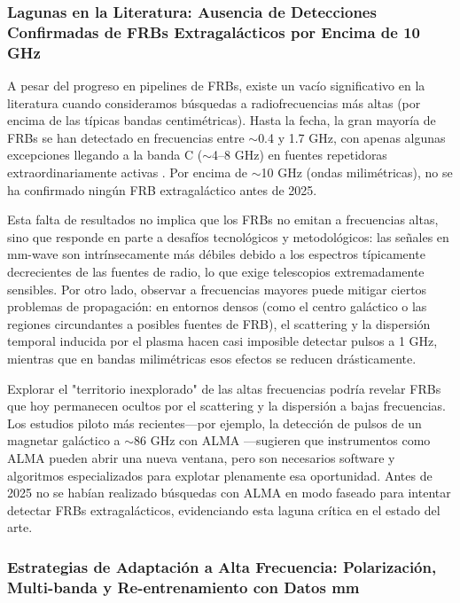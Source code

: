 \subsubsection{Lagunas en la Literatura: Ausencia de Detecciones Confirmadas de FRBs Extragalácticos por Encima de 10 GHz}

A pesar del progreso en pipelines de FRBs, existe un vacío significativo en la literatura cuando consideramos búsquedas a radiofrecuencias más altas (por encima de las típicas bandas centimétricas). Hasta la fecha, la gran mayoría de FRBs se han detectado en frecuencias entre $\sim$0.4 y 1.7 GHz, con apenas algunas excepciones llegando a la banda C ($\sim$4--8 GHz) en fuentes repetidoras extraordinariamente activas \citep{Gajjar2018,Bethapudi2023}. Por encima de $\sim$10 GHz (ondas milimétricas), no se ha confirmado ningún FRB extragaláctico antes de 2025.

Esta falta de resultados no implica que los FRBs no emitan a frecuencias altas, sino que responde en parte a desafíos tecnológicos y metodológicos: las señales en mm-wave son intrínsecamente más débiles debido a los espectros típicamente decrecientes de las fuentes de radio, lo que exige telescopios extremadamente sensibles. Por otro lado, observar a frecuencias mayores puede mitigar ciertos problemas de propagación: en entornos densos (como el centro galáctico o las regiones circundantes a posibles fuentes de FRB), el scattering y la dispersión temporal inducida por el plasma hacen casi imposible detectar pulsos a 1 GHz, mientras que en bandas milimétricas esos efectos se reducen drásticamente.

Explorar el "territorio inexplorado" de las altas frecuencias podría revelar FRBs que hoy permanecen ocultos por el scattering y la dispersión a bajas frecuencias. Los estudios piloto más recientes—por ejemplo, la detección de pulsos de un magnetar galáctico a $\sim$86 GHz con ALMA \citep{veracasanova2025}—sugieren que instrumentos como ALMA pueden abrir una nueva ventana, pero son necesarios software y algoritmos especializados para explotar plenamente esa oportunidad. Antes de 2025 no se habían realizado búsquedas con ALMA en modo faseado para intentar detectar FRBs extragalácticos, evidenciando esta laguna crítica en el estado del arte.

\subsubsection{Estrategias de Adaptación a Alta Frecuencia: Polarización, Multi-banda y Re-entrenamiento con Datos mm}

